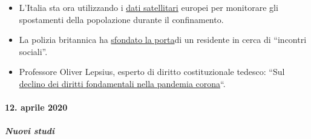 \begin{itemize}
\item
  L'Italia sta ora utilizzando i
  \href{https://www.ansa.it/english/news/2020/04/06/coronavirus-italy-activates-satellite-to-monitor-nation-3_f2ffb30c-d550-42f5-82fc-ec1f82c5c625.html}{dati
  satellitari} europei per monitorare gli spostamenti della popolazione
  durante il confinamento.
\item
  La polizia britannica ha
  \href{https://twitter.com/BanTheBBC/status/1249598512427347969}{sfondato
  la porta}di un residente in cerca di ``incontri sociali''.
\item
  Professore Oliver Lepsius, esperto di diritto costituzionale tedesco:
  ``Sul
  \href{https://verfassungsblog.de/vom-niedergang-grundrechtlicher-denkkategorien-in-der-corona-pandemie/}{declino
  dei diritti fondamentali nella pandemia corona}``.
\end{itemize}

\hypertarget{12-aprile-2020-}{%
\paragraph{12. aprile 2020 }\label{12-aprile-2020-}}

\hypertarget{nuovi-studi}{%
\subparagraph{\texorpdfstring{\textbf{Nuovi
studi}}{Nuovi studi}}\label{nuovi-studi}}

